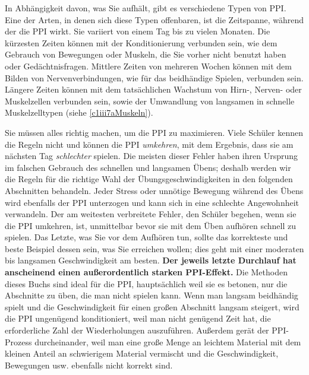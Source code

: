 In Abhängigkeit davon, was Sie aufhält, gibt es verschiedene Typen von PPI.
Eine der Arten, in denen sich diese Typen offenbaren, ist die Zeitspanne, während der die PPI wirkt.
Sie variiert von einem Tag bis zu vielen Monaten.
Die kürzesten Zeiten können mit der Konditionierung verbunden sein, wie dem Gebrauch von Bewegungen oder Muskeln, die Sie vorher nicht benutzt haben oder Gedächtnisfragen.
Mittlere Zeiten von mehreren Wochen können mit dem Bilden von Nervenverbindungen, wie für das beidhändige Spielen, verbunden sein.
Längere Zeiten können mit dem tatsächlichen Wachstum von Hirn-, Nerven- oder Muskelzellen verbunden sein, sowie der Umwandlung von langsamen in schnelle Muskelzelltypen (siehe \hyperref[c1iii7aMuskeln]{\autoref{c1iii7aMuskeln}}).

Sie müssen alles richtig machen, um die PPI zu maximieren.
Viele Schüler kennen die Regeln nicht und können die PPI \textit{umkehren}, mit dem Ergebnis, dass sie am nächsten Tag \textit{schlechter} spielen.
Die meisten dieser Fehler haben ihren Ursprung im falschen Gebrauch des schnellen und langsamen Übens; deshalb werden wir die Regeln für die richtige Wahl der Übungsgeschwindigkeiten in den folgenden Abschnitten behandeln.
Jeder Stress oder unnötige Bewegung während des Übens wird ebenfalls der PPI unterzogen und kann sich in eine schlechte Angewohnheit verwandeln.
Der am weitesten verbreitete Fehler, den Schüler begehen, wenn sie die PPI umkehren, ist, unmittelbar bevor sie mit dem Üben aufhören schnell zu spielen.
Das Letzte, was Sie vor dem Aufhören tun, sollte das korrekteste und beste Beispiel dessen sein, was Sie erreichen wollen; dies geht mit einer moderaten bis langsamen Geschwindigkeit am besten.
\textbf{Der jeweils letzte Durchlauf hat anscheinend einen außerordentlich starken PPI-Effekt.}
Die Methoden dieses Buchs sind ideal für die PPI, hauptsächlich weil sie es betonen, nur die Abschnitte zu üben, die man nicht spielen kann.
Wenn man langsam beidhändig spielt und die Geschwindigkeit für einen großen Abschnitt langsam steigert, wird die PPI ungenügend konditioniert, weil man nicht genügend Zeit hat, die erforderliche Zahl der Wiederholungen auszuführen.
Außerdem gerät der PPI-Prozess durcheinander, weil man eine große Menge an leichtem Material mit dem kleinen Anteil an schwierigem Material vermischt und die Geschwindigkeit, Bewegungen usw. ebenfalls nicht korrekt sind.

